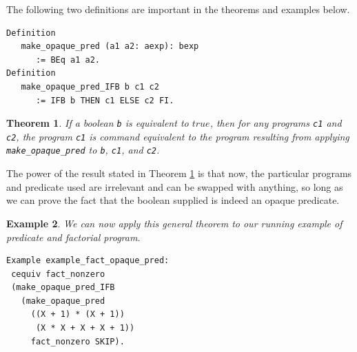 \documentclass[compsoc,conference,a4paper,10pt,times]{IEEEtran}
\newtheorem{theorem}{Theorem}[section]
\newtheorem{example}[theorem]{Example}
\begin{document}
The following two definitions are important in the theorems and examples below.
\begin{verbatim}
Definition 
   make_opaque_pred (a1 a2: aexp): bexp 
      := BEq a1 a2.
Definition 
   make_opaque_pred_IFB b c1 c2 
      := IFB b THEN c1 ELSE c2 FI.
\end{verbatim}

\begin{theorem}\label{generalcequiv}
If a boolean \texttt{b} is equivalent to $true$, then for any programs \texttt{c1} and \texttt{c2},
the program \texttt{c1} is command equivalent to the program resulting from applying \texttt{make\_opaque\_pred}
to \texttt{b}, \texttt{c1}, and \texttt{c2}. 
\end{theorem}

The power of the result stated in Theorem \ref{generalcequiv}
is that now, the particular programs and predicate used are irrelevant and can be swapped with anything, so long as we can prove the fact that the boolean supplied is indeed an opaque predicate. 

\begin{example}\label{factopaqueex}
We can now apply this general theorem to our running example of predicate and factorial program.
\begin{verbatim}
Example example_fact_opaque_pred: 
 cequiv fact_nonzero 
 (make_opaque_pred_IFB 
   (make_opaque_pred 
     ((X + 1) * (X + 1)) 
      (X * X + X + X + 1)) 
     fact_nonzero SKIP).
\end{verbatim}
\end{example}




\end{document}
